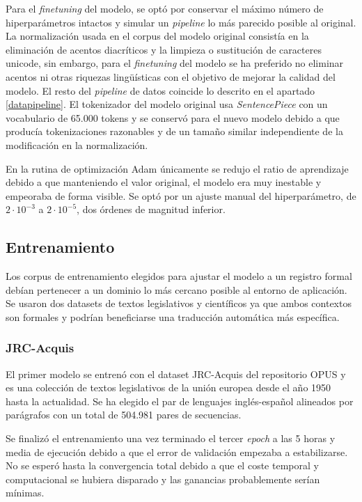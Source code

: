 Para el \textit{finetuning} del modelo, se optó por conservar el máximo número de hiperparámetros intactos y simular un \textit{pipeline} lo más parecido posible al original.
La normalización usada en el corpus del modelo original consistía en la eliminación de acentos diacríticos y la limpieza o sustitución de caracteres unicode, sin embargo, para el \textit{finetuning} del modelo se ha preferido no eliminar acentos ni otras riquezas ling{\"u}ísticas con el objetivo de mejorar la calidad del modelo. El resto del \textit{pipeline} de datos coincide lo descrito en el apartado \ref{datapipeline}.
El tokenizador del modelo original usa \textit{SentencePiece} con un vocabulario de 65.000 tokens y se conservó para el nuevo modelo debido a que producía tokenizaciones razonables y de un tamaño similar independiente de la modificación en la normalización.

En la rutina de optimización Adam \cite{Kingma2014Dec} únicamente se redujo el ratio de aprendizaje debido a que manteniendo el valor original, el modelo era muy inestable y empeoraba de forma visible. Se optó por un ajuste manual del hiperparámetro, de $2\cdot 10^{-3}$ a $2\cdot 10^{-5}$, dos órdenes de magnitud inferior.

\subsection{Entrenamiento}
Los corpus de entrenamiento elegidos para ajustar el modelo a un registro formal debían pertenecer a un dominio lo más cercano posible al entorno de aplicación. Se usaron dos datasets de textos legislativos y científicos ya que ambos contextos son formales y podrían beneficiarse una traducción automática más específica.
\subsubsection{JRC-Acquis}
El primer modelo se entrenó con el dataset JRC-Acquis del repositorio OPUS \cite{CORPUS} y es una colección de textos legislativos de la unión europea desde el año 1950 hasta la actualidad. Se ha elegido el par de lenguajes inglés-español alineados por parágrafos con un total de 504.981 pares de secuencias.

Se finalizó el entrenamiento una vez terminado el tercer \textit{epoch} a las 5 horas y media de ejecución debido a que el error de validación empezaba a estabilizarse. No se esperó hasta la convergencia total debido a que el coste temporal y computacional se hubiera disparado y las ganancias probablemente serían mínimas.

